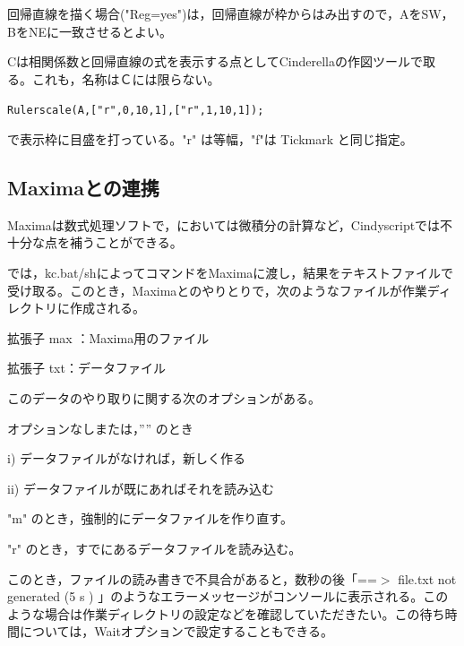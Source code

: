 \documentclass[papersize,a4paper,12pt,uplatex]{jsarticle}
\begin{document}
\begin{description}
回帰直線を描く場合("Reg=yes")は，回帰直線が枠からはみ出すので，AをSW，BをNEに一致させるとよい。

Cは相関係数と回帰直線の式を表示する点としてCinderellaの作図ツールで取る。これも，名称はＣには限らない。

      \verb|Rulerscale(A,["r",0,10,1],["r",1,10,1]);|

 で表示枠に目盛を打っている。"r" は等幅，"f"は Tickmark  と同じ指定。
 
\vspace{\baselineskip}
          \begin{center}  \end{center}
\end{description}
\newpage

\subsection{Maximaとの連携}
Maximaは数式処理ソフトで，\ketcindy においては微積分の計算など，Cindyscriptでは不十分な点を補うことができる。

  \ketcindy では，kc.bat/shによってコマンドをMaximaに渡し，結果をテキストファイルで受け取る。このとき，Maximaとのやりとりで，次のようなファイルが作業ディレクトリに作成される。
  
拡張子 max ：Maxima用のファイル

拡張子 txt：データファイル

このデータのやり取りに関する次のオプションがある。

  オプションなしまたは，”” のとき
  
    i) データファイルがなければ，新しく作る
    
    ii) データファイルが既にあればそれを読み込む
    
  "m"  のとき，強制的にデータファイルを作り直す。
  
  "r" のとき，すでにあるデータファイルを読み込む。
  
  このとき，ファイルの読み書きで不具合があると，数秒の後「==$>$ file.txt not generated (5 s ) 」のようなエラーメッセージがコンソールに表示される。このような場合は作業ディレクトリの設定などを確認していただきたい。この待ち時間については，Waitオプションで設定することもできる。
  
\end{document}
